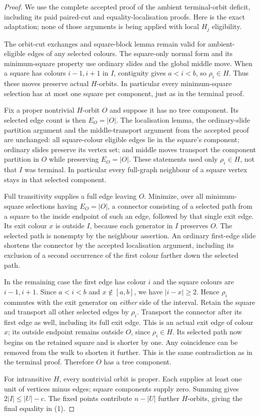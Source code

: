 \documentclass[11pt,a4paper]{article}
\begin{document}
\begin{proof}
We use the complete accepted proof of the ambient terminal-orbit
deficit, including its paid paired-cut and equality-localisation
proofs. Here is the exact adaptation; none of those arguments is
being applied with local $H_j$ eligibility.

The orbit-cut exchanges and square-block lemma remain valid for
ambient-eligible edges of any selected colours. The square-only
normal form and its minimum-square property use ordinary slides
and the global middle move. When a square has colours $i-1,i+1$
in $I$, contiguity gives $a<i<b$, so $\rho_i\in H$.
Thus these moves preserve actual $H$-orbits. In particular every
minimum-square selection has at most one square per component,
just as in the terminal proof.

Fix a proper nontrivial $H$-orbit $O$ and suppose it has no tree
component. Its selected edge count is then $E_O=|O|$.
The localisation lemma, the ordinary-slide partition argument and
the middle-transport argument from the accepted proof are unchanged:
all square-colour eligible edges lie in the square's component;
ordinary slides preserve its vertex set; and middle moves transport
the component partition in $O$ while preserving $E_O=|O|$.
These statements used only $\rho_i\in H$, not that $I$ was terminal.
In particular every full-graph neighbour of a square vertex stays
in that selected component.

Full transitivity supplies a full edge leaving $O$. Minimize, over
all minimum-square selections having $E_O=|O|$, a connector consisting
of a selected path from a square to the inside endpoint of such an
edge, followed by that single exit edge. Its exit colour $x$ is
outside $I$, because each generator in $I$ preserves $O$.
The selected path is nonempty by the neighbour assertion.
An ordinary first-edge slide shortens the connector by the accepted
localisation argument, including its exclusion of a second occurrence
of the first colour farther down the selected path.

In the remaining case the first edge has colour $i$ and the square
colours are $i-1,i+1$. Since $a<i<b$ and $x\notin[a,b]$, we have
$|i-x|\geq2$. Hence $\rho_i$ commutes with the exit generator
on \emph{either} side of the interval. Retain the square and transport
all other selected edges by $\rho_i$. Transport the connector after
its first edge as well, including its full exit edge. This is an
actual exit edge of colour $x$; its outside endpoint remains outside
$O$, since $\rho_i\in H$. Its selected path now begins on the retained
square and is shorter by one. Any coincidence can be removed from
the walk to shorten it further. This is the same contradiction as
in the terminal proof. Therefore $O$ has a tree component.

For intransitive $H$, every nontrivial orbit is proper. Each supplies
at least one unit of vertices minus edges; square components supply
zero. Summing gives $2|I|\leq |U|-c$. The fixed points contribute
$n-|U|$ further $H$-orbits, giving the final equality in (1).
\end{proof}
\end{document}
